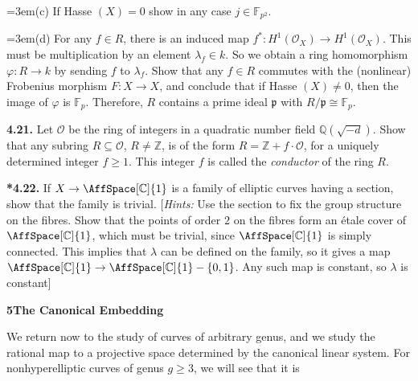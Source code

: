 {\noindent\hangindent=3em\hspace*{1.7em}(c) If Hasse $(X)=0$ show in any case $j\in\mathbb F_{p^2}$\EditionText{}.

\noindent\hangindent=3em\hspace*{1.7em}(d) For any $f\in R$, there is an induced map $f^*\colon H^1(\mathcal O_X)\to H^1(\mathcal O_X)$. This must be multiplication by an element $\lambda_f\in k$. So we obtain a ring homomorphism $\varphi\colon R\to k$ by sending $f$ to $\lambda_f$. Show that any $f\in R$ commutes with the (nonlinear) Frobenius morphism $F\colon X\to X$, and conclude that if Hasse $(X)\ne0$, then the image of $\varphi$ is $\mathbb F_p$. Therefore, $R$ contains a prime ideal $\mathfrak p$ with $R/\mathfrak p\cong\mathbb F_p$.

\smallskip
\noindent\hypertarget{ex-IV-4.21}{}\textbf{4.21.} Let $\mathcal O$ be the ring of integers in a quadratic number field $\mathbb Q(\sqrt{-d})$. Show that any subring $R\subseteq\mathcal O$, $R\ne\mathbb Z$, is of the form $R=\mathbb Z+f\cdot\mathcal O$, for a uniquely determined integer $f\ge1$. This integer $f$ is called the \emph{conductor} of the ring $R$.

\smallskip
\noindent\hypertarget{ex-IV-4.22}{}\textbf{*4.22.} If $X\to\AffSpace[\mathbb C]{1}$ is a family of elliptic curves having a section, show that the family is trivial. [\emph{Hints:} Use the section to fix the group structure on the fibres. Show that the points of order $2$ on the fibres form an \'etale cover of $\AffSpace[\mathbb C]{1}$, which must be trivial, since $\AffSpace[\mathbb C]{1}$ is simply connected. This implies that $\lambda$ can be defined on the family, so it gives a map $\AffSpace[\mathbb C]{1}\to\AffSpace[\mathbb C]{1}-\{0,1\}$. Any such map is constant, so $\lambda$ is constant]

\medskip
\noindent\hypertarget{sec-IV-5}{}{\large\bfseries 5\quad The Canonical Embedding}\par
\smallskip
We return now to the study of curves of arbitrary genus, and we study the rational map to a projective space determined by the canonical linear system. For nonhyperelliptic curves of genus $g\ge3$, we will see that it is}
